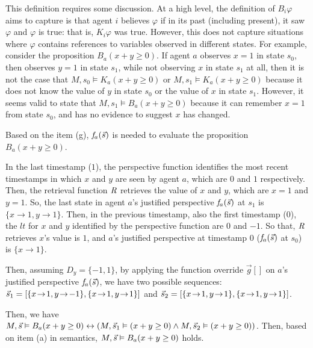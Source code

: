 This definition requires some discussion.
At a high level, the definition of $B_i \varphi$ aims to capture is that agent $i$ believes $\varphi$ if in its past (including present), it saw $\varphi$ and $\varphi$ is true: that is, $K_i\varphi$ was true. 
However, this does not capture situations where $\varphi$ contains references to variables observed in different states. 
For example, consider the proposition $B_a (x + y \geq 0)$. 
If agent $a$ observes $x=1$ in state $s_0$, then observes $y = 1$ in state $s_1$, while not observing $x$ in state $s_1$ at all, then it is not the case that $M, s_0 \vDash K_a (x + y \geq 0)$ or $M, s_1 \vDash K_a (x + y \geq 0)$ because it does not know the value of $y$ in state $s_0$ or the value of $x$ in state $s_1$. 
However, it seems valid to state that $M, s_1 \vDash B_a (x + y \geq 0)$ because it can remember $x=1$ from state $s_0$, and has no evidence to suggest $x$ has changed. 

Based on the item (g), $\mathit{f}_a(\Vec{s})$ is needed to evaluate the proposition $B_a (x + y \geq 0)$. 

In the last timestamp ($1$), the perspective function identifies the most recent timestamps in which $x$ and $y$ are seen by agent $a$, which are $0$ and $1$ respectively. 
Then, the retrieval function $\mathit{R}$ retrieves the value of $x$ and $y$, which are $x=1$ and $y=1$.
So, the last state in agent $a$'s justified perspective $\mathit{f}_a(\Vec{s})$ at $s_1$ is $\{x \!\rightarrow\! 1,y \!\rightarrow\! 1\}$.
Then, in the previous timestamp, also the first timestamp ($0$), the $lt$ for $x$ and $y$ identified by the perspective function are $0$ and $-1$.
So that, $\mathit{R}$ retrieves $x$'s value is $1$, and $a$'s justified perspective at timestamp $0$ ($\mathit{f}_a(\Vec{s})$ at $s_0$) is $\{x \!\rightarrow\! 1\}$.

Then, assuming $D_y = \{-1,1\}$, by applying the function override $\vec{g}[ ]$ on $a$'s justified perspective $\mathit{f}_a(\Vec{s})$, we have two possible sequences:
$\seq_1 = [\{x \!\rightarrow\! 1,y \!\rightarrow\! -1\},\{x \!\rightarrow\! 1,y \!\rightarrow\! 1\}]$ and $\seq_2 = [\{x \!\rightarrow\! 1,y \!\rightarrow\! 1\},\{x \!\rightarrow\! 1,y \!\rightarrow\! 1\}]$.

Then, we have $M,\Vec{s} \vDash B_a (x + y \geq 0) \leftrightarrow (M,\Vec{s}_1 \vDash (x + y \geq 0) \land M,\Vec{s}_2 \vDash (x + y \geq 0))$.
Then, based on item (a) in semantics, $M,\Vec{s} \vDash B_a (x + y \geq 0)$ holds.




